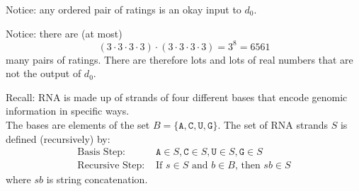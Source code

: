 \documentclass[12pt, oneside]{article}
\newcommand{\A}[0]{\texttt{A}}
\newcommand{\C}[0]{\texttt{C}}
\newcommand{\G}[0]{\texttt{G}}
\newcommand{\U}[0]{\texttt{U}}
\begin{document}
Notice: any ordered pair of ratings is an okay input to $d_0$.

Notice: there are (at most) 
\[
(3 \cdot 3 \cdot 3 \cdot 3)\cdot (3 \cdot 3 \cdot 3 \cdot 3) = 3^8 = 6561
\]
many pairs of ratings. There are therefore lots and lots of real numbers that are not the output of $d_0$.

\vfill

Recall: RNA is made up of strands of four different bases that encode genomic information
in specific ways.\\
The bases are elements of the set 
$B  = \{\A, \C, \U, \G \}$. The set of RNA strands $S$ is defined (recursively) by:
\[
\begin{array}{ll}
\textrm{Basis Step: } & \A \in S, \C \in S, \U \in S, \G \in S \\
\textrm{Recursive Step: } & \textrm{If } s \in S\textrm{ and }b \in B \textrm{, then }sb \in S
\end{array}
\]
where $sb$ is string concatenation.

\vfill
\end{document}
